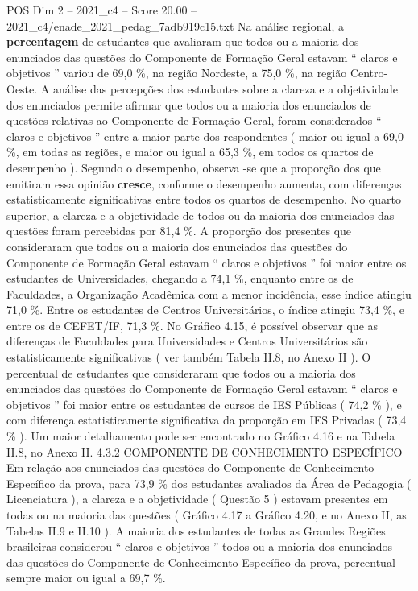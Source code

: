 \begin{textsample}{POS Dim 2 – 2021\_c4 – Score 20.00 – 2021\_c4/enade\_2021\_pedag\_7adb919c15.txt}
Na análise regional, a \textbf{percentagem} de estudantes que avaliaram que todos ou a maioria dos enunciados das questões do Componente de Formação Geral estavam “ claros e objetivos ” variou de 69,0 \%, na região Nordeste, a 75,0 \%, na região Centro-Oeste.
A análise das percepções dos estudantes sobre a clareza e a objetividade dos enunciados permite afirmar que todos ou a maioria dos enunciados de questões relativas ao Componente de Formação Geral, foram considerados “ claros e objetivos ” entre a maior parte dos respondentes ( maior ou igual a 69,0 \%, em todas as regiões, e maior ou igual a 65,3 \%, em todos os quartos de desempenho ).
Segundo o desempenho, observa -se que a proporção dos que emitiram essa opinião \textbf{cresce}, conforme o desempenho aumenta, com diferenças estatisticamente significativas entre todos os quartos de desempenho.
No quarto superior, a clareza e a objetividade de todos ou da maioria dos enunciados das questões foram percebidas por 81,4 \%.
A proporção dos presentes que consideraram que todos ou a maioria dos enunciados das questões do Componente de Formação Geral estavam “ claros e objetivos ” foi maior entre os estudantes de Universidades, chegando a 74,1 \%, enquanto entre os de Faculdades, a Organização Acadêmica com a menor incidência, esse índice atingiu 71,0 \%.
Entre os estudantes de Centros Universitários, o índice atingiu 73,4 \%, e entre os de CEFET/IF, 71,3 \%.
No Gráfico 4.15, é possível observar que as diferenças de Faculdades para Universidades e Centros Universitários são estatisticamente significativas ( ver também Tabela II.8, no Anexo II ).
O percentual de estudantes que consideraram que todos ou a maioria dos enunciados das questões do Componente de Formação Geral estavam “ claros e objetivos ” foi maior entre os estudantes de cursos de IES Públicas ( 74,2 \% ), e com diferença estatisticamente significativa da proporção em IES Privadas ( 73,4 \% ).
Um maior detalhamento pode ser encontrado no Gráfico 4.16 e na Tabela II.8, no Anexo II. 4.3.2 COMPONENTE DE CONHECIMENTO ESPECÍFICO Em relação aos enunciados das questões do Componente de Conhecimento Específico da prova, para 73,9 \% dos estudantes avaliados da Área de Pedagogia ( Licenciatura ), a clareza e a objetividade ( Questão 5 ) estavam presentes em todas ou na maioria das questões ( Gráfico 4.17 a Gráfico 4.20, e no Anexo II, as Tabelas II.9 e II.10 ).
A maioria dos estudantes de todas as Grandes Regiões brasileiras considerou “ claros e objetivos ” todos ou a maioria dos enunciados das questões do Componente de Conhecimento Específico da prova, percentual sempre maior ou igual a 69,7 \%.

\end{textsample}
